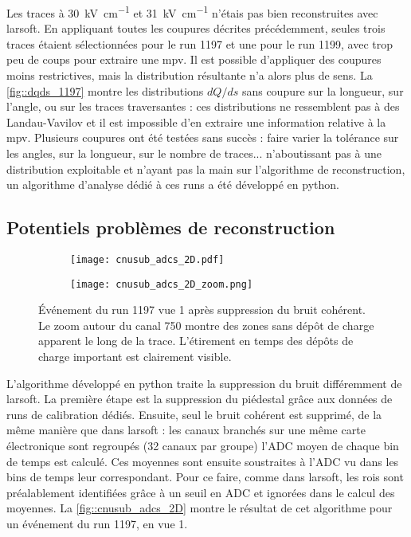     Les traces à \SI{30}{\kilo\volt\per\centi\meter} et \SI{31}{\kilo\volt\per\centi\meter} n'étais pas bien reconstruites avec \gls{larsoft}. En appliquant toutes les coupures décrites précédemment, seules trois traces étaient sélectionnées pour le run 1197 et une pour le run 1199, avec trop peu de coups pour extraire une \gls{mpv}. Il est possible d'appliquer des coupures moins restrictives, mais la distribution résultante n'a alors plus de sens. La \autoref{fig::dqds_1197} montre les distributions $dQ/ds$ sans coupure sur la longueur, sur l'angle, ou sur les traces traversantes : ces distributions ne ressemblent pas à des Landau-Vavilov et il est impossible d'en extraire une information relative à la \gls{mpv}. Plusieurs coupures ont été testées sans succès : faire varier la tolérance sur les angles, sur la longueur, sur le nombre de traces... n'aboutissant pas à une distribution exploitable et n'ayant pas la main sur l'algorithme de reconstruction, un algorithme d'analyse dédié à ces runs a été développé en python.

    \subsection{Potentiels problèmes de reconstruction}

      \begin{figure}[htbp]
        \centering
        \begin{subfigure}[t]{0.8\textwidth}
          \centering
          \texttt{[image: cnusub\_adcs\_2D.pdf]}
        \end{subfigure}\hfill
        \begin{subfigure}[t]{0.19\textwidth}
          \centering
          \texttt{[image: cnusub\_adcs\_2D\_zoom.png]}
        \end{subfigure}
        \caption[Événement du run 1197 vue 1 après suppression du bruit cohérent]{\label{fig::cnusub_adcs_2D}Événement du run 1197 vue 1 après suppression du bruit cohérent. Le zoom autour du canal 750 montre des zones sans dépôt de charge apparent le long de la trace. L'étirement en temps des dépôts de charge important est clairement visible.}
      \end{figure}

      L'algorithme développé en python traite la suppression du bruit différemment de \gls{larsoft}. La première étape est la suppression du piédestal grâce aux données de runs de calibration dédiés. Ensuite, seul le bruit cohérent est supprimé, de la même manière que dans \gls{larsoft} : les canaux branchés sur une même carte électronique sont regroupés (32 canaux par groupe) l'ADC moyen de chaque bin de temps est calculé. Ces moyennes sont ensuite soustraites à l'ADC vu dans les bins de temps leur correspondant. Pour ce faire, comme dans \gls{larsoft}, les \glspl{roi} sont préalablement identifiées grâce à un seuil en ADC et ignorées dans le calcul des moyennes. La \autoref{fig::cnusub_adcs_2D} montre le résultat de cet algorithme pour un événement du run 1197, en vue 1.

